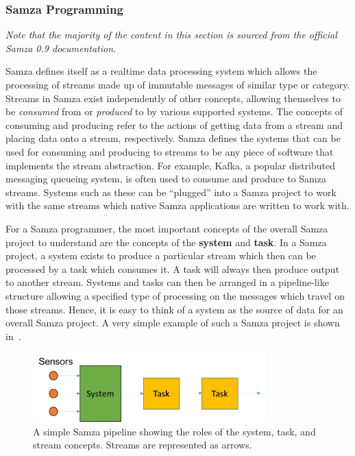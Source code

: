 \subsubsection{Samza Programming} %
\label{ssub:samza_programming}

\textit{Note that the majority of the content in this section is sourced from the official Samza 0.9 documentation.}~\cite{Samza6:online}

Samza defines itself as a realtime data processing system which allows the processing of streams made up of immutable
messages of similar type or category. Streams in Samza exist independently of other concepts, allowing themselves to be
\textit{consumed} from or \textit{produced} to by various supported systems. The concepts of consuming and producing refer
to the actions of getting data from a stream and placing data onto a stream, respectively. Samza defines the systems that can be used
for consuming and producing to streams to be any piece of software that implements the stream abstraction. For example,
Kafka, a popular distributed messaging queueing system, is often used to consume and produce to Samza streams. Systems such as these can be
``plugged'' into a Samza project to work with the same streams which native Samza applications are written to work with.

For a Samza programmer, the most important concepts of the overall Samza project to understand are the concepts of the
\textbf{system} and \textbf{task}. In a Samza project, a system exists to produce a particular stream which then can
be processed by a task which consumes it. A task will always then produce output to another stream. Systems and tasks
can then be arranged in a pipeline-like structure allowing a specified type of processing on the messages which travel
on those streams. Hence, it is easy to think of a system as the source of data for an overall Samza project. A very
simple example of such a Samza project is shown in~.

\begin{figure}[h]
  \centering
  \includegraphics[width=0.8\textwidth]{includes/figures/fig_samza_overview}
  \caption{A simple Samza pipeline showing the roles of the system, task, and stream concepts. Streams are represented
  as arrows.}
  \label{fig:samza_overview}
\end{figure}


